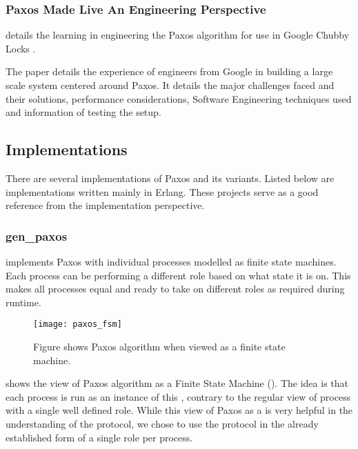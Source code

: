 \subsubsection{Paxos Made Live \dash{} An Engineering Perspective}

\cite{ChandraGR07}
details the learning in engineering the Paxos algorithm for use in
Google Chubby Locks \citep{Burrows06}.

The paper details the experience of engineers from Google in building a
large scale system centered around Paxos. It details the major challenges faced
and their solutions, performance considerations, Software Engineering techniques
used and information of testing the setup.

\subsection{Implementations}

There are several implementations of Paxos and its variants. Listed below are
implementations written mainly in Erlang. These projects serve as a good
reference from the implementation perspective.

\subsubsection{gen\_paxos}

\citep{Uenishi2012} implements Paxos with
individual processes modelled as finite state machines. Each process can
be performing a different role based on what state it is on. This
makes all processes equal and ready to take on different roles
as required during runtime.
   
\begin{figure}
  \begin{whole}
  \texttt{[image: paxos\_fsm]}
  \caption[Paxos ]{%
    Figure shows Paxos algorithm when viewed as a finite state machine.}
  \label{figure:paxos.fsm}
  \end{whole}
\end{figure}

 shows the view of Paxos algorithm as a Finite State
Machine (). The idea is that each process is run as an instance of 
this , contrary to the regular view of process with a single well
defined role. While this view of Paxos as a  is very helpful in the
understanding of the protocol, we chose to use the protocol in the already
established form of a single role per process.

